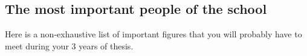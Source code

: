 \subsection{The most important people of the school}
Here is a non-exhaustive list of important figures that you will probably have to meet during your 3 years of thesis.

\newcommand{\largcol}{0.29\textwidth}

\newcommand{\pers}[4]{%
\begin{tabular}{m{\largcol}}%
\ifthenelse{\equal{#1}{}}{\todo{Photo}}{}%
\\ \textbf{#2} \\ \textit{(#3)} \\ #4
\end{tabular}}

